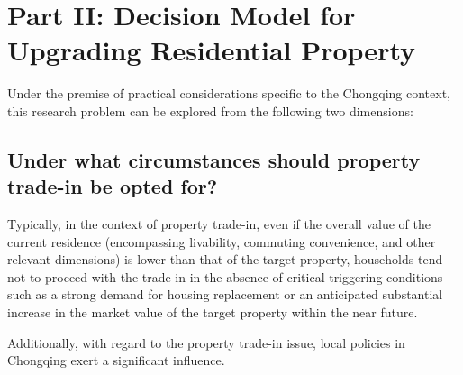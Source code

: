 \documentclass{mcmthesis}
\begin{document}
\section{Part II: Decision Model for Upgrading Residential Property } %

Under the premise of practical considerations specific to the Chongqing context, 
this research problem can be explored from the following two dimensions:


\subsection{Under what circumstances should property trade-in be opted for?} %

Typically, in the context of property trade-in, 
even if the overall value of the current residence (encompassing livability, commuting convenience, and other relevant dimensions) is lower than that of the target property, 
households tend not to proceed with the trade-in in the absence of 
critical triggering conditions—such as a strong demand for housing replacement or 
an anticipated substantial increase in the market value of the target property within the near future.

Additionally, with regard to the property trade-in issue, local policies in Chongqing exert a significant influence.
\end{document}
